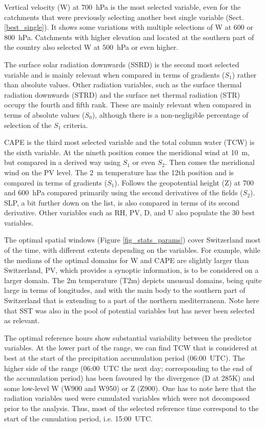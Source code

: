 \documentclass[draft]{agujournal2019}
\begin{document}
Vertical velocity (W) at 700~hPa is the most selected variable, even for the catchments that were previously selecting another best single variable (Sect. \ref{best_single}). It shows some variations with multiple selections of W at 600 or 800~hPa. Catchments with higher elevation and located at the southern part of the country also selected W at 500~hPa or even higher.

The surface solar radiation downwards (SSRD) is the second most selected variable and is mainly relevant when compared in terms of gradients ($S_{1}$) rather than absolute values. Other radiation variables, such as the surface thermal radiation downwards (STRD) and the surface net thermal radiation (STR) occupy the fourth and fifth rank. These are mainly relevant when compared in terms of absolute values ($S_{0}$), although there is a non-negligible percentage of selection of the $S_{1}$ criteria.

CAPE is the third most selected variable and the total column water (TCW) is the sixth variable. At the nineth position comes the meridional wind at 10~m, but compared in a derived way using $S_{1}$ or even $S_{2}$. Then comes the meridional wind on the PV level. The 2~m temperature has the 12th position and is compared in terms of gradients ($S_{1}$). Follows the geopotential height (Z) at 700 and 600~hPa compared primarily using the second derivatives of the fields ($S_{2}$). SLP, a bit further down on the list, is also compared in terms of its second derivative. Other variables such as RH, PV, D, and U also populate the 30 best variables.

The optimal spatial windows (Figure \ref{fig_stats_params}) cover Switzerland most of the time, with different extents depending on the variables. For example, while the medians of the optimal domains for W and CAPE are slightly larger than Switzerland, PV, which provides a synoptic information, is to be considered on a larger domain. The 2m temperature (T2m) depicts unsusual domains, being quite large in terms of longitudes, and with the main body to the southern part of Switzerland that is extending to a part of the northern mediterranean. Note here that SST was also in the pool of potential variables but has never been selected as relevant.

The optimal reference hours show substantial variability between the predictor variables. At the lower part of the range, we can find TCW that is considered at best at the start of the precipitation accumulation period (06:00~UTC). The higher side of the range (06:00~UTC the next day; corresponding to the end of the accumulation period) has been favoured by the divergence (D at 285\degree K) and some low-level W (W900 and W950) or Z (Z900). One has to note here that the radiation variables used were cumulated variables which were not decomposed prior to the analysis. Thus, most of the selected reference time correspond to the start of the cumulation period, i.e. 15:00~UTC.
\end{document}
